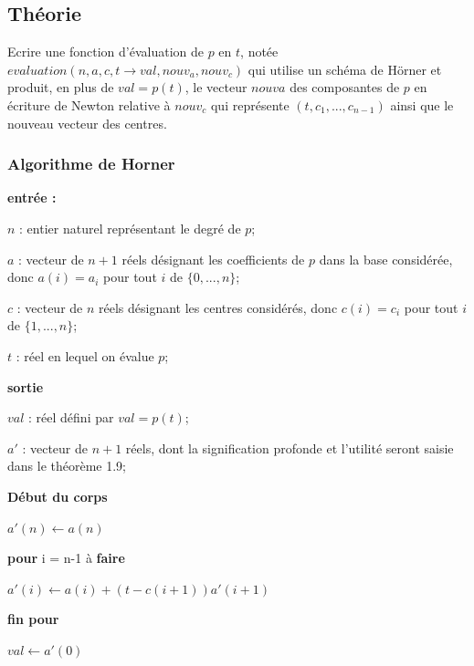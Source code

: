 \documentclass[a4paper,10pt]{report}
\begin{document}
\subsection*{Théorie}

Ecrire une fonction d’évaluation de $p$ en $t$, notée $evaluation(n, a, c, t →
val, nouv_a, nouv_c)$ qui utilise un schéma de Hörner et produit, en plus de
$val = p(t)$, le vecteur $nouv{a}$ des composantes de $p$ en écriture de Newton
relative à $nouv_c$ qui représente $(t, c_{1}, ..., c_{n−1})$ ainsi que le nouveau vecteur des centres.

\subsubsection*{Algorithme de Horner}

\textbf{entrée :}

\begin{list}{}{}
\item $n$ : entier naturel représentant le degré de $p$;
\item $a$ : vecteur de $n+1$ réels désignant les coefficients de $p$ dans la base considérée, donc $a(i) = a_{i}$ pour tout $i$ de $\lbrace 0, ..., n\rbrace$;
\item $c$ : vecteur de $n$ réels désignant les centres considérés, donc $c(i)=c_{i}$ pour tout $i$ de $\lbrace 1, ..., n\rbrace$;
\item $t$ : réel en lequel on évalue $p$;
\end{list}

\textbf{sortie}
\begin{list}{}{}
\item $val$ : réel défini par $val = p(t)$;
\item $a'$ : vecteur de $n+1$ réels, dont la signification profonde et l'utilité seront saisie dans le théorème 1.9;
\end{list}

\textbf{Début du corps}
\begin{list}{}{}
\item $a'(n) \longleftarrow a(n)$
\item \textbf{pour} i = n-1 à \textbf{faire}
\item \begin{list}{}{}
\item $a'(i) \longleftarrow a(i) + (t-c(i+1))a'(i+1)$
\end{list}
\item \textbf{fin pour}
\item $val \longleftarrow a'(0)$
\end{list}
\end{document}
